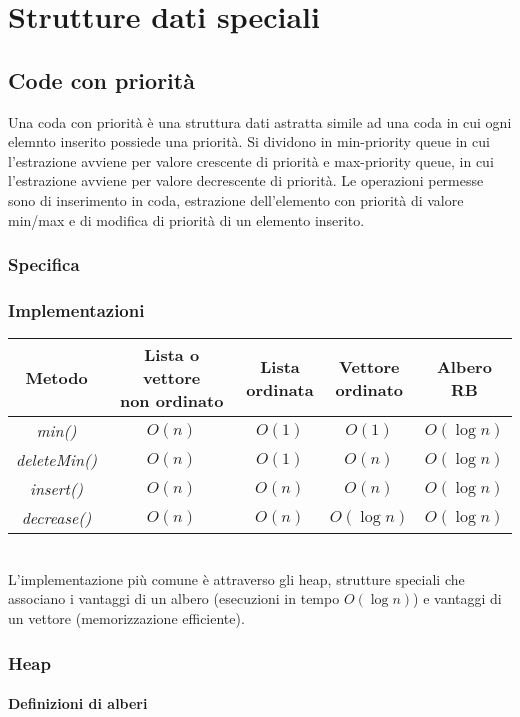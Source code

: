 \chapter{Strutture dati speciali}
\section{Code con priorit\`a}
Una coda con priorit\`a \`e una struttura dati astratta simile ad una coda in cui ogni elemnto inserito possiede una priorit\`a. Si dividono in min-priority 
queue in cui l'estrazione avviene per valore crescente di priorit\`a e max-priority queue, in cui l'estrazione avviene per valore decrescente di priorit\`a.
Le operazioni permesse sono di inserimento in coda, estrazione dell'elemento con priorit\`a di valore min/max e di modifica di priorit\`a di un elemento 
inserito.
\subsection{Specifica}

\subsection{Implementazioni}
\begin{tabular}{|c|c|c|c|c|}
\hline
Metodo & \makecell{Lista o vettore \\non ordinato} & \makecell{Lista\\ordinata} & \makecell{Vettore\\ordinato} & \makecell{Albero\\RB}\\
\hline
\emph{min()} & $O(n)$ & $O(1)$ & $O(1)$ & $O(\log n)$\\
\hline
\emph{deleteMin()} & $O(n)$ & $O(1)$ & $O(n)$ & $O(\log n)$\\
\hline
\emph{insert()} & $O(n)$ & $O(n)$ & $O(n)$ & $O(\log n)$\\
\hline
\emph{decrease()} & $O(n)$ & $O(n)$ & $O(\log n)$ & $O(\log n)$\\
\hline
\end{tabular}\\
L'implementazione pi\`u comune \`e attraverso gli heap, strutture speciali che associano i vantaggi di un albero (esecuzioni in tempo $O(\log n)$) e 
vantaggi di un vettore (memorizzazione efficiente).
\subsection{Heap}
\subsubsection{Definizioni di alberi}
